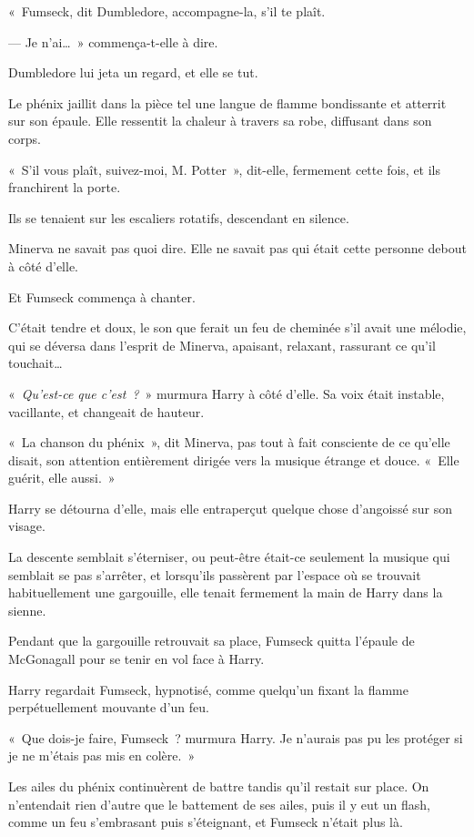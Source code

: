 «~Fumseck, dit Dumbledore, accompagne-la, s'il te plaît.

--- Je n'ai…~»
commença-t-elle à dire.

Dumbledore lui jeta un regard, et elle se tut.

Le phénix jaillit dans la pièce tel une langue de flamme bondissante et atterrit sur son épaule.
Elle ressentit la chaleur à travers sa robe, diffusant dans son corps.

«~S'il vous plaît, suivez-moi, M. Potter~», dit-elle, fermement cette fois, et ils franchirent la porte.

\later

Ils se tenaient sur les escaliers rotatifs, descendant en silence.

Minerva ne savait pas quoi dire.
Elle ne savait pas qui était cette personne debout à côté d'elle.

Et Fumseck commença à chanter.

C'était tendre et doux, le son que ferait un feu de cheminée s'il avait une mélodie, qui se déversa dans l'esprit de Minerva, apaisant, relaxant, rassurant ce qu'il touchait…

«~\emph{Qu'est-ce que c'est~?}~»
murmura Harry à côté d'elle.
Sa voix était instable, vacillante, et changeait de hauteur.

«~La chanson du phénix~», dit Minerva, pas tout à fait consciente de ce qu'elle disait, son attention entièrement dirigée vers la musique étrange et douce.
«~Elle guérit, elle aussi.~»

Harry se détourna d'elle, mais elle entraperçut quelque chose d'angoissé sur son visage.

La descente semblait s'éterniser, ou peut-être était-ce seulement la musique qui semblait se pas s'arrêter, et lorsqu'ils passèrent par l'espace où se trouvait habituellement une gargouille, elle tenait fermement la main de Harry dans la sienne.

Pendant que la gargouille retrouvait sa place, Fumseck quitta l'épaule de McGonagall pour se tenir en vol face à Harry.

Harry regardait Fumseck, hypnotisé, comme quelqu'un fixant la flamme perpétuellement mouvante d'un feu.

«~Que dois-je faire, Fumseck~? murmura Harry.
Je n'aurais pas pu les protéger si je ne m'étais pas mis en colère.~»

Les ailes du phénix continuèrent de battre tandis qu'il restait sur place.
On n'entendait rien d'autre que le battement de ses ailes, puis il y eut un flash, comme un feu s'embrasant puis s'éteignant, et Fumseck n'était plus là.

